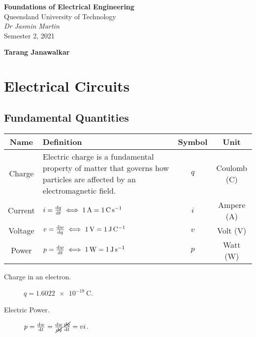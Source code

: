 \documentclass{article}
\date{}
\newcommand{\uniTitle}{Queensland University of Technology}
\newcommand{\className}{Foundations of Electrical Engineering}
\newcommand{\classTime}{Semester 2, 2021}
\newcommand{\classInstructorName}{Dr Jasmin Martin}
\newcommand{\authorName}{Tarang Janawalkar}
\begin{document}
\begin{titlepage}
    \vspace*{\fill}
	\begin{center}
        \LARGE
        \textbf{\className}
        \texorpdfstring{\\}{ }
        \uniTitle
        \texorpdfstring{\\}{ }
        \texorpdfstring{\vspace{0.3in}}{ }
        \normalsize\textit{\classInstructorName}
        \texorpdfstring{\\}{ }
        \classTime
    \end{center}
    \begin{center}
        \textbf{\authorName}
    \end{center}
    \vspace*{\fill}
    \doclicenseThis
    \thispagestyle{empty}
\end{titlepage}
\newpage

\tableofcontents
\newpage

\section{Electrical Circuits}
\subsection{Fundamental Quantities}
\begingroup
\renewcommand{\arraystretch}{1.5}
\begin{table}[H]
    \centering
    \begin{tabular}{c | >{\centering}p{} | c c}
        \toprule
        \textbf{Name} & \textbf{Definition} & \textbf{Symbol} & \textbf{Unit} \\
        \midrule
        Charge & Electric charge is a fundamental property of matter that governs how particles are affected by an electromagnetic field.
        & $q$ & Coulomb (\unit{\coulomb}) \\
        \hline
        Current & $i=\dv{q}{t}\iff\SI{1}{\ampere}=\SI{1}{\coulomb\per\s}$
        & $i$ & Ampere (\unit{\ampere}) \\
        \hline
        Voltage & $v=\dv{w}{q}\iff\SI{1}{\volt}=\SI{1}{\joule\per\coulomb}$
        & $v$ & Volt (\unit{\volt}) \\
        \hline
        Power & $p=\dv{w}{t}\iff\SI{1}{\watt}=\SI{1}{\joule\per\s}$
        & $p$ & Watt (\unit{\watt}) \\
        \bottomrule
    \end{tabular}
\end{table}
\endgroup
\begin{description}
    \item[Charge in an electron.] $q=\SI{1.6022e-19}{\coulomb}$.
    \item[Electric Power.] $p=\dv{w}{t}=\frac{\dd{w}}{\cancel{\dd{q}}} \frac{\cancel{\dd{q}}}{\dd{t}}=vi$. 
\end{description}
\end{document}
